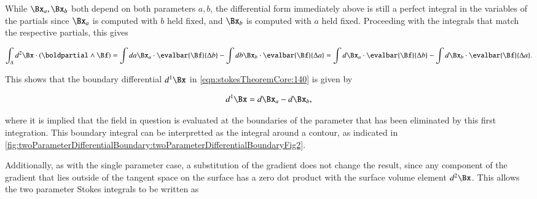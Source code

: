 While \( \Bx_a, \Bx_b \) both depend on both parameters \( a, b \), the differential form immediately above is still a perfect integral in the variables of the partials since \( \Bx_a \) is computed with \( b \) held fixed, and \( \Bx_b \) is computed with \( a \) held fixed.  Proceeding with the integrals that match the respective partials, this gives

\begin{dmath}\label{eqn:stokesTheoremCore:240}
\int_A d^2 \Bx \cdot (\boldpartial \wedge \Bf)
=
\int
da \Bx_a \cdot \evalbar{\Bf}{\Delta b}
-\int
db \Bx_b \cdot \evalbar{\Bf}{\Delta a}
=
\int
d\Bx_a \cdot \evalbar{\Bf}{\Delta b}
-\int
d\Bx_b \cdot \evalbar{\Bf}{\Delta a}.
\end{dmath}

This shows that the boundary differential \( d^1 \Bx \) in \cref{eqn:stokesTheoremCore:140} is given by

\begin{dmath}\label{eqn:stokesTheoremCore:260}
d^1 \Bx = d\Bx_a - d\Bx_b,
\end{dmath}

where it is implied that the field in question is evaluated at the boundaries of the parameter that has been eliminated by this first integration.  This boundary integral can be interpretted as the integral around a contour, as indicated in
\cref{fig:twoParameterDifferentialBoundary:twoParameterDifferentialBoundaryFig2}.


Additionally, as with the single parameter case, a substitution of the gradient does not change the result, since any component of the gradient that lies outside of the tangent space on the surface has a zero dot product with the surface volume element \( d^2 \Bx \).
This allows the two parameter Stokes integrals to be written as


